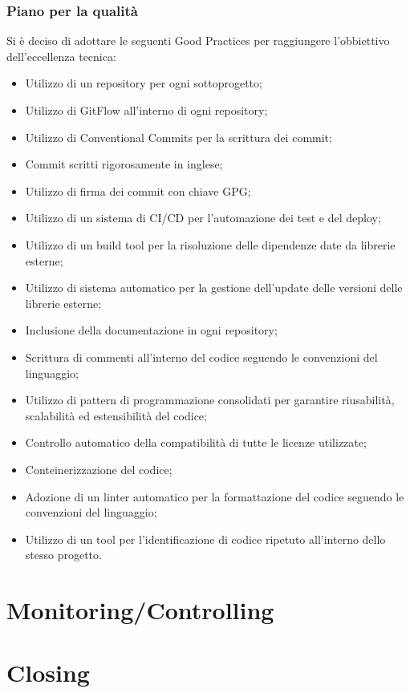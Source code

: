 \documentclass{article}
\begin{document}
  \subsubsection{Piano per la qualità}
  Si è deciso di adottare le seguenti Good Practices per raggiungere l'obbiettivo dell'eccellenza tecnica:
  \begin{itemize}
    \item Utilizzo di un repository per ogni sottoprogetto;
    \item Utilizzo di GitFlow all'interno di ogni repository;
    \item Utilizzo di Conventional Commits per la scrittura dei commit;
    \item Commit scritti rigorosamente in inglese;
    \item Utilizzo di firma dei commit con chiave GPG;
    \item Utilizzo di un sistema di CI/CD per l'automazione dei test e del deploy;
    \item Utilizzo di un build tool per la risoluzione delle dipendenze date da librerie esterne;
    \item Utilizzo di sistema automatico per la gestione dell'update delle versioni delle librerie esterne;
    \item Inclusione della documentazione in ogni repository;
    \item Scrittura di commenti all’interno del codice seguendo le convenzioni del linguaggio;
    \item Utilizzo di pattern di programmazione consolidati per garantire riusabilità, scalabilità ed estensibilità
      del codice;
    \item Controllo automatico della compatibilità di tutte le licenze utilizzate;
    \item Conteinerizzazione del codice;
    \item Adozione di un linter automatico per la formattazione del codice seguendo le convenzioni del
      linguaggio;
    \item Utilizzo di un tool per l’identificazione di codice ripetuto all’interno dello stesso progetto.
  \end{itemize}


  \newpage
  \section{Monitoring/Controlling}

  



  \newpage
  \section{Closing}
\end{document}

